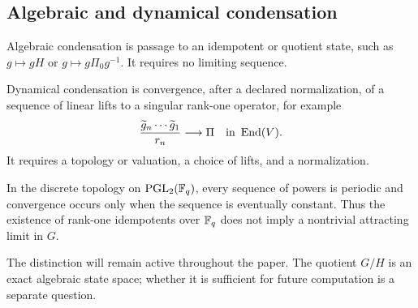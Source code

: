 \subsection{Algebraic and dynamical condensation}

\begin{definition}
Algebraic condensation is passage to an idempotent or quotient state, such as
$g\mapsto gH$ or $g\mapsto g\Pi_0g^{-1}$.  It requires no limiting sequence.
\end{definition}

\begin{definition}
Dynamical condensation is convergence, after a declared normalization, of a
sequence of linear lifts to a singular rank-one operator, for example
\[
  \frac{\widetilde g_n\cdots\widetilde g_1}{r_n}
  \longrightarrow \Pi
  \quad\text{in }\operatorname{End}(V).
\]
It requires a topology or valuation, a choice of lifts, and a normalization.
\end{definition}

\begin{proposition}
In the discrete topology on $\operatorname{PGL}_2(\mathbb{F}_q)$, every sequence of powers is
periodic and convergence occurs only when the sequence is eventually constant.
Thus the existence of rank-one idempotents over $\mathbb{F}_q$ does not imply a
nontrivial attracting limit in $G$.
\end{proposition}

The distinction will remain active throughout the paper.  The quotient
$G/H$ is an exact algebraic state space; whether it is sufficient for future
computation is a separate question.
